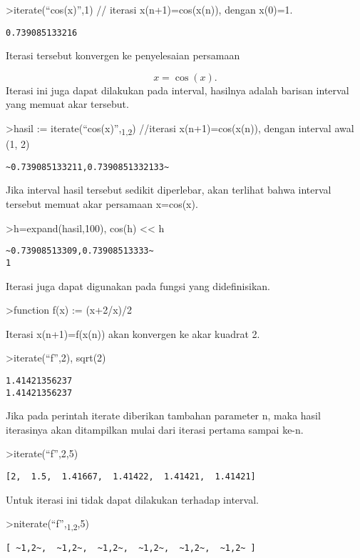 \documentclass[
]{book}
\begin{document}
\textgreater iterate(``cos(x)'',1) // iterasi x(n+1)=cos(x(n)), dengan x(0)=1.

\begin{verbatim}
0.739085133216
\end{verbatim}

Iterasi tersebut konvergen ke penyelesaian persamaan

\[x = \cos(x).\]Iterasi ini juga dapat dilakukan pada interval, hasilnya adalah barisan interval yang memuat akar tersebut.

\textgreater hasil := iterate(``cos(x)'',\textsubscript{1,2}) //iterasi x(n+1)=cos(x(n)), dengan interval awal (1, 2)

\begin{verbatim}
~0.739085133211,0.7390851332133~
\end{verbatim}

Jika interval hasil tersebut sedikit diperlebar, akan terlihat bahwa interval tersebut memuat akar persamaan x=cos(x).

\textgreater h=expand(hasil,100), cos(h) \textless\textless{} h

\begin{verbatim}
~0.73908513309,0.73908513333~
1
\end{verbatim}

Iterasi juga dapat digunakan pada fungsi yang didefinisikan.

\textgreater function f(x) := (x+2/x)/2

Iterasi x(n+1)=f(x(n)) akan konvergen ke akar kuadrat 2.

\textgreater iterate(``f'',2), sqrt(2)

\begin{verbatim}
1.41421356237
1.41421356237
\end{verbatim}

Jika pada perintah iterate diberikan tambahan parameter n, maka hasil iterasinya akan ditampilkan mulai dari iterasi pertama sampai ke-n.

\textgreater iterate(``f'',2,5)

\begin{verbatim}
[2,  1.5,  1.41667,  1.41422,  1.41421,  1.41421]
\end{verbatim}

Untuk iterasi ini tidak dapat dilakukan terhadap interval.

\textgreater niterate(``f'',\textsubscript{1,2},5)

\begin{verbatim}
[ ~1,2~,  ~1,2~,  ~1,2~,  ~1,2~,  ~1,2~,  ~1,2~ ]
\end{verbatim}
\end{document}
